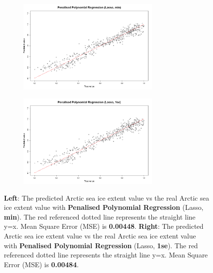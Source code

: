 \begin{figure}[htbp]
\center
  \begin{subfigure}{7.5cm}
    \centering\includegraphics[width=7cm]{Figure/4.2.3-PPR-min.png}
  \end{subfigure}
  \begin{subfigure}{7.5cm}
    \centering\includegraphics[width=7cm]{Figure/4.2.3-PPR-1se.png}
  \end{subfigure}
  \caption{\textbf{Left}: The predicted Arctic sea ice extent value vs the real Arctic sea ice extent value with \textbf{Penalised Polynomial Regression} (Lasso, \textbf{min}). The red referenced dotted line represents the straight line y=x. Mean Square Error (MSE) is \textbf{0.00448}. \textbf{Right}: The predicted Arctic sea ice extent value vs the real Arctic sea ice extent value with \textbf{Penalised Polynomial Regression} (Lasso, \textbf{1se}). The red referenced dotted line represents the straight line y=x. Mean Square Error (MSE) is \textbf{0.00484}.}
  \label{4.2.3-PPR-min-1se}
\end{figure}

\newpage